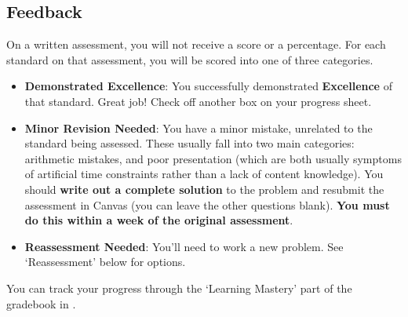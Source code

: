 \documentclass{article}
\begin{document}
    \subsection*{\fontsize{10}{12}\selectfont Feedback}
    On a written assessment, you will not receive a score or a percentage.  For each standard on that assessment, you will be scored into one of three categories.
\begin{itemize}
    \item \textbf{Demonstrated Excellence}: You successfully demonstrated {\bf Excellence} of that standard.  Great job!  Check off another box on your progress sheet.
    \item \textbf{Minor Revision Needed}: You have a minor mistake, unrelated to the standard being assessed.  These usually fall into two main categories: arithmetic mistakes, and poor presentation (which are both usually symptoms of artificial time constraints rather than a lack of content knowledge).  You should {\bf write out a complete solution} to the problem and resubmit the assessment in Canvas (you can leave the other questions blank). \textbf{You must do this within a week of the original assessment}.    
    \item \textbf{Reassessment Needed}: You'll need to work a new problem. See `Reassessment' below for options.
    \end{itemize}

You can track your progress through the `Learning Mastery' part of the gradebook in \LMS. 
\end{document}
